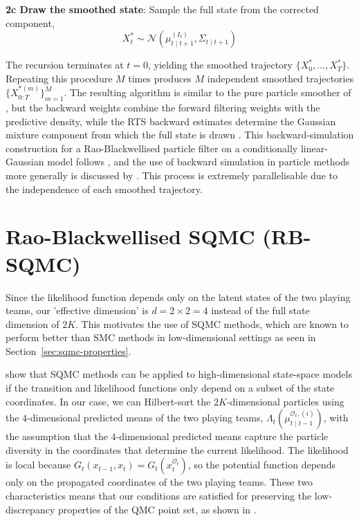 \textbf{2c Draw the smoothed state}: Sample the full state from the corrected component,
\begin{equation}
    X_t^* \sim \mathcal{N}\left( \mu_{t \mid t+1}^{(I_t)}, \Sigma_{t \mid t+1} \right) \nonumber
\end{equation}

The recursion terminates at $t = 0$, yielding the smoothed trajectory $\{X_0^*, \dots, X_T^*\}$. Repeating this procedure $M$ times produces $M$ independent smoothed trajectories $\{X_{0:T}^{*(m)}\}_{m=1}^M$. The resulting algorithm is similar to the pure particle smoother of \citet{godsilldoucetwest2004montecarlosmoothing}, but the backward weights combine the forward filtering weights with the predictive density, while the RTS backward estimates determine the Gaussian mixture component from which the full state is drawn \citep{sarkkabunchgodsill2012rbpsmoother}. This backward-simulation construction for a Rao-Blackwellised particle filter on a conditionally linear-Gaussian model follows \citet{lindstenschonbunchgodsill2012rbpsmoother}, and the use of backward simulation in particle methods more generally is discussed by \citet{lindstenschon2011backwardsimulation}. This process is extremely parallelisable due to the independence of each smoothed trajectory.

\section{Rao-Blackwellised SQMC (RB-SQMC)}
\label{sec:rb-sqmc}

Since the likelihood function depends only on the latent states of the two playing teams, our 'effective dimension' is $d = 2 \times 2 = 4$ instead of the full state dimension of $2K$. This motivates the use of SQMC methods, which are known to perform better than SMC methods in low-dimensional settings as seen in Section~\ref{sec:sqmc-properties}. 


\citep{chopingerber2017sqmcintroduction} show that SQMC methods can be applied to high-dimensional state-space models if the transition and likelihood functions only depend on a subset of the state coordinates. In our case, we can Hilbert-sort the $2K$-dimensional particles using the $4$-dimensional predicted means of the two playing teams, $\Lambda_t(\mu_{t \mid t-1}^{\mathcal{O}_t, (i)})$, with the assumption that the $4$-dimensional predicted means capture the particle diversity in the coordinates that determine the current likelihood. The likelihood is local because $G_t(x_{t-1}, x_t) = G_t(x_t^{\mathcal{O}_t})$, so the potential function depends only on the propagated coordinates of the two playing teams. These two characteristics means that our conditions are satisfied for preserving the low-discrepancy properties of the QMC point set, as shown in \citet{chopingerber2017sqmcintroduction}. 

